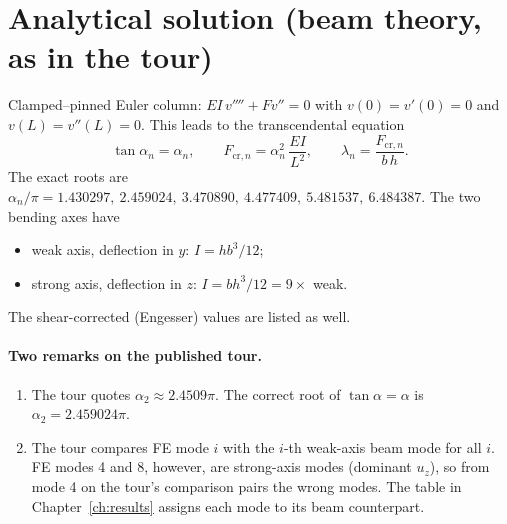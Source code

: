 \documentclass[11pt,a4paper]{report}
\begin{document}
\section{Analytical solution (beam theory, as in the tour)}
Clamped--pinned Euler column: $EI\,v''''+F v''=0$ with $v(0)=v'(0)=0$ and
$v(L)=v''(L)=0$. This leads to the transcendental equation
\begin{equation}
  \tan\alpha_n = \alpha_n,\qquad F_{\text{cr},n} = \alpha_n^2\,\frac{EI}{L^2},
  \qquad \lambda_n = \frac{F_{\text{cr},n}}{b\,h} .
\end{equation}
The exact roots are
$\alpha_n/\pi = 1.430297,\ 2.459024,\ 3.470890,\ 4.477409,\ 5.481537,\ 6.484387$.
The two bending axes have
\begin{itemize}
\item weak axis, deflection in $y$: $I = h b^3/12$;
\item strong axis, deflection in $z$: $I = b h^3/12 = 9\times$ weak.
\end{itemize}
The shear-corrected (Engesser) values are listed as well.

\paragraph{Two remarks on the published tour.}
\begin{enumerate}
\item The tour quotes $\alpha_2\approx2.4509\pi$. The correct root of
  $\tan\alpha=\alpha$ is $\alpha_2 = 2.459024\pi$.
\item The tour compares FE mode $i$ with the $i$-th weak-axis beam mode for
  all $i$. FE modes 4 and 8, however, are strong-axis modes (dominant $u_z$),
  so from mode 4 on the tour's comparison pairs the wrong modes. The table in
  Chapter~\ref{ch:results} assigns each mode to its beam counterpart.
\end{enumerate}
\end{document}
